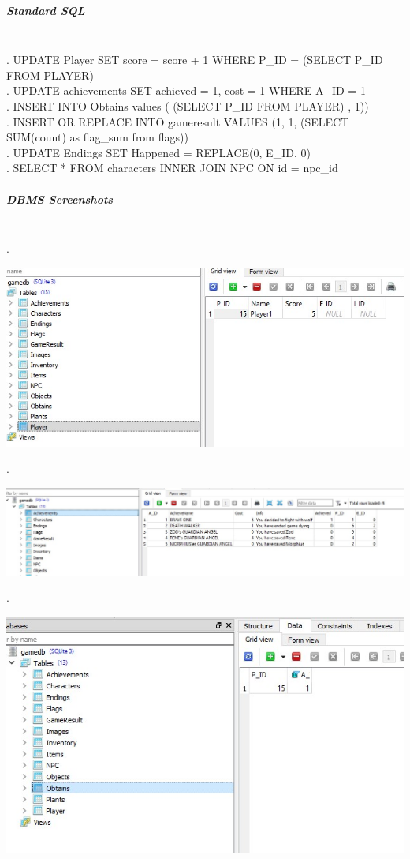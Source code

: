 \documentclass[12pt,a4paper]{article}
\newcommand{\ind}{\indent\indent}
\begin{document}
\subparagraph{Standard SQL\\}
\ind\\
\ind 1. UPDATE Player SET score = score + 1 WHERE P\_ID = (SELECT P\_ID FROM PLAYER) \\
\ind 2. UPDATE achievements SET achieved = 1, cost = 1 WHERE A\_ID = 1\\
\ind 3. INSERT INTO Obtains values ( (SELECT P\_ID FROM PLAYER) , 1)) \\
\ind 4. INSERT OR REPLACE INTO gameresult VALUES (1, 1, (SELECT SUM(count) as flag\_sum from flags))\\
\ind 5. UPDATE Endings SET Happened = REPLACE(0, E\_ID, 0)\\ 
\ind 6. SELECT * FROM characters INNER JOIN NPC ON id = npc\_id\\


\subparagraph{\textit{DBMS} Screenshots\\}
\ind\\
\ind 1.\\
\begin{center}
\includegraphics[scale=1]{images/TESTING/DB31.jpg}
\end{center} 
\ind 2.\\
\begin{center}
\includegraphics[scale=1]{images/TESTING/DB3.jpg}
\end{center} 
\ind 3.\\
\begin{center}
\includegraphics[scale=1]{images/TESTING/DB32.jpg}
\end{center} 
\end{document}
